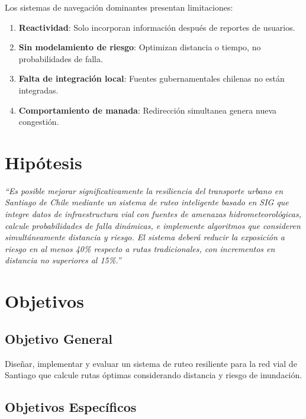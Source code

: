 \documentclass[conference]{IEEEtran}
\begin{document}
Los sistemas de navegación dominantes presentan limitaciones:

\begin{enumerate}
    \item \textbf{Reactividad}: Solo incorporan información después de reportes de usuarios.
    \item \textbf{Sin modelamiento de riesgo}: Optimizan distancia o tiempo, no probabilidades de falla.
    \item \textbf{Falta de integración local}: Fuentes gubernamentales chilenas no están integradas.
    \item \textbf{Comportamiento de manada}: Redirección simultanea genera nueva congestión.
\end{enumerate}

\section{Hipótesis}

\textit{``Es posible mejorar significativamente la resiliencia del transporte urbano en Santiago de Chile mediante un sistema de ruteo inteligente basado en SIG que integre datos de infraestructura vial con fuentes de amenazas hidrometeorológicas, calcule probabilidades de falla dinámicas, e implemente algoritmos que consideren simultáneamente distancia y riesgo. El sistema deberá reducir la exposición a riesgo en al menos 40\% respecto a rutas tradicionales, con incrementos en distancia no superiores al 15\%.''}

\section{Objetivos}

\subsection{Objetivo General}

Diseñar, implementar y evaluar un sistema de ruteo resiliente para la red vial de Santiago que calcule rutas óptimas considerando distancia y riesgo de inundación.

\subsection{Objetivos Específicos}
\end{document}
